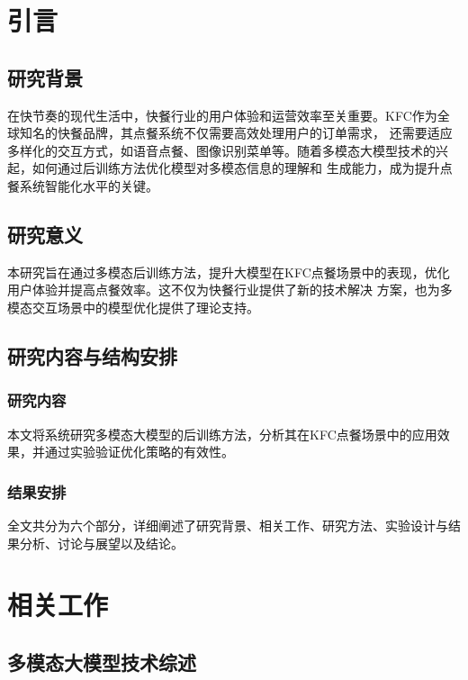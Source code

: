 \documentclass{xdupgthesis}
\begin{document}
\chapter{引言}

\section{研究背景}

在快节奏的现代生活中，快餐行业的用户体验和运营效率至关重要。KFC作为全球知名的快餐品牌，其点餐系统不仅需要高效处理用户的订单需求，
还需要适应多样化的交互方式，如语音点餐、图像识别菜单等。随着多模态大模型技术的兴起，如何通过后训练方法优化模型对多模态信息的理解和
生成能力，成为提升点餐系统智能化水平的关键。

\section{研究意义}

本研究旨在通过多模态后训练方法，提升大模型在KFC点餐场景中的表现，优化用户体验并提高点餐效率。这不仅为快餐行业提供了新的技术解决
方案，也为多模态交互场景中的模型优化提供了理论支持。


\section{研究内容与结构安排}


\subsection{研究内容}

本文将系统研究多模态大模型的后训练方法，分析其在KFC点餐场景中的应用效果，并通过实验验证优化策略的有效性。


\subsection{结果安排}

全文共分为六个部分，详细阐述了研究背景、相关工作、研究方法、实验设计与结果分析、讨论与展望以及结论。

\chapter{相关工作}

\section{多模态大模型技术综述}
\end{document}
